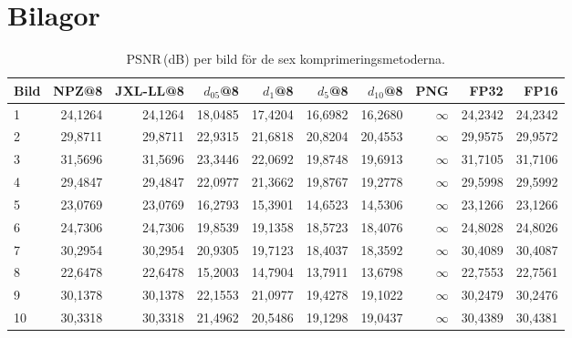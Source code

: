 \appendix
\section{Bilagor}

\begin{table}[H]
\centering
\caption{PSNR\,(dB) per bild för de sex komprimeringsmetoderna.}
\label{tab:psnr_per_image}
{\footnotesize
\begin{tabular}{lrrrrrrrrr}
\hline
\textbf{Bild} & \textbf{NPZ@8} & \textbf{JXL-LL@8} & \boldmath$d_{05}$@8 & \boldmath$d_1$@8 & \boldmath$d_5$@8 & \boldmath$d_{10}$@8 & \textbf{PNG} & \textbf{FP32} & \textbf{FP16} \\
\hline
 1 & 24{,}1264 & 24{,}1264 & 18{,}0485 & 17{,}4204 & 16{,}6982 & 16{,}2680 & $\infty$ & 24{,}2342 & 24{,}2342 \\
 2 & 29{,}8711 & 29{,}8711 & 22{,}9315 & 21{,}6818 & 20{,}8204 & 20{,}4553 & $\infty$ & 29{,}9575 & 29{,}9572 \\
 3 & 31{,}5696 & 31{,}5696 & 23{,}3446 & 22{,}0692 & 19{,}8748 & 19{,}6913 & $\infty$ & 31{,}7105 & 31{,}7106 \\
 4 & 29{,}4847 & 29{,}4847 & 22{,}0977 & 21{,}3662 & 19{,}8767 & 19{,}2778 & $\infty$ & 29{,}5998 & 29{,}5992 \\
 5 & 23{,}0769 & 23{,}0769 & 16{,}2793 & 15{,}3901 & 14{,}6523 & 14{,}5306 & $\infty$ & 23{,}1266 & 23{,}1266 \\
 6 & 24{,}7306 & 24{,}7306 & 19{,}8539 & 19{,}1358 & 18{,}5723 & 18{,}4076 & $\infty$ & 24{,}8028 & 24{,}8026 \\
 7 & 30{,}2954 & 30{,}2954 & 20{,}9305 & 19{,}7123 & 18{,}4037 & 18{,}3592 & $\infty$ & 30{,}4089 & 30{,}4087 \\
 8 & 22{,}6478 & 22{,}6478 & 15{,}2003 & 14{,}7904 & 13{,}7911 & 13{,}6798 & $\infty$ & 22{,}7553 & 22{,}7561 \\
 9 & 30{,}1378 & 30{,}1378 & 22{,}1553 & 21{,}0977 & 19{,}4278 & 19{,}1022 & $\infty$ & 30{,}2479 & 30{,}2476 \\
10 & 30{,}3318 & 30{,}3318 & 21{,}4962 & 20{,}5486 & 19{,}1298 & 19{,}0437 & $\infty$ & 30{,}4389 & 30{,}4381 \\

\end{tabular}}
\end{table}
